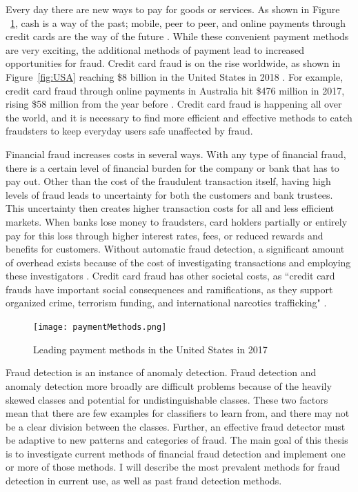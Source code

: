 \documentclass[midd]{thesis}
\begin{document}
Every day there are new ways to pay for goods or services. As shown in Figure ~\ref{fig:paymentMethods}, cash is a way of the past; mobile, peer to peer, and online payments through credit cards are the way of the future \cite{paymentMethods}. While these convenient payment methods are very exciting, the additional methods of payment lead to increased opportunities for fraud. Credit card fraud is on the rise worldwide, as shown in Figure~\ref{fig:USA} reaching \$8 billion in the United States in 2018 \cite{USA}. For example, credit card fraud through online payments in Australia hit \$476 million in 2017, rising \$58 million from the year before \cite{Wang2018}. Credit card fraud is happening all over the world, and it is necessary to find more efficient and effective methods to catch fraudsters to keep everyday users safe unaffected by fraud. 

Financial fraud increases costs in several ways. With any type of financial fraud, there is a certain level of financial burden for the company or bank that has to pay out. Other than the cost of the fraudulent transaction itself, having high levels of fraud leads to uncertainty for both the customers and bank trustees. This uncertainty then creates higher transaction costs for all and less efficient markets. When banks lose money to fraudsters, card holders partially or entirely pay for this loss through higher interest rates, fees, or reduced rewards and benefits for customers. Without automatic fraud detection, a significant amount of overhead exists because of the cost of investigating transactions and employing these investigators \cite{Chan}. Credit card fraud has other societal costs, as ``credit card frauds have important social consequences and ramifications, as they support organized crime, terrorism funding, and international narcotics trafficking" \cite{Zanin2018}.

\begin{figure}
  \texttt{[image: paymentMethods.png]}
  \caption{Leading payment methods in the United States in 2017 \cite{paymentMethods}}
  \label{fig:paymentMethods}
\end{figure}

Fraud detection is an instance of anomaly detection. Fraud detection and anomaly detection more broadly are difficult problems because of the heavily skewed classes and potential for undistinguishable classes. These two factors mean that there are few examples for classifiers to learn from, and there may not be a clear division between the classes. Further, an effective fraud detector must be adaptive to new patterns and categories of fraud. The main goal of this thesis is to investigate current methods of financial fraud detection and implement one or more of those methods. I will describe the most prevalent methods for fraud detection in current use, as well as past fraud detection methods.
\end{document}
